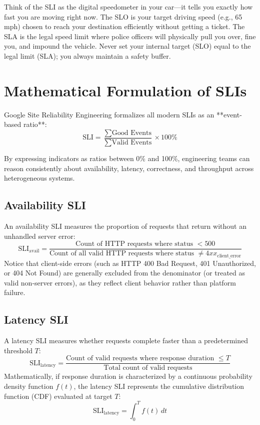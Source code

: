 \begin{intuitionbox}
Think of the SLI as the digital speedometer in your car—it tells you exactly how fast you are moving right now. The SLO is your target driving speed (e.g., 65 mph) chosen to reach your destination efficiently without getting a ticket. The SLA is the legal speed limit where police officers will physically pull you over, fine you, and impound the vehicle. Never set your internal target (SLO) equal to the legal limit (SLA); you always maintain a safety buffer.
\end{intuitionbox}

\section{Mathematical Formulation of SLIs}

Google Site Reliability Engineering formalizes all modern SLIs as an **event-based ratio**:
\begin{equation}
\text{SLI} = \frac{\sum \text{Good Events}}{\sum \text{Valid Events}} \times 100\%
\end{equation}

By expressing indicators as ratios between 0\% and 100\%, engineering teams can reason consistently about availability, latency, correctness, and throughput across heterogeneous systems.

\subsection{Availability SLI}

An availability SLI measures the proportion of requests that return without an unhandled server error:
\begin{equation}
\text{SLI}_{\text{avail}} = \frac{\text{Count of HTTP requests where status } < 500}{\text{Count of all valid HTTP requests where status } \ne 4xx_{\text{client\_error}}}
\end{equation}
Notice that client-side errors (such as HTTP 400 Bad Request, 401 Unauthorized, or 404 Not Found) are generally excluded from the denominator (or treated as valid non-server errors), as they reflect client behavior rather than platform failure.

\subsection{Latency SLI}

A latency SLI measures whether requests complete faster than a predetermined threshold $T$:
\begin{equation}
\text{SLI}_{\text{latency}} = \frac{\text{Count of valid requests where response duration } \le T}{\text{Total count of valid requests}}
\end{equation}
Mathematically, if response duration is characterized by a continuous probability density function $f(t)$, the latency SLI represents the cumulative distribution function (CDF) evaluated at target $T$:
\begin{equation}
\text{SLI}_{\text{latency}} = \int_0^T f(t) \, dt
\end{equation}

